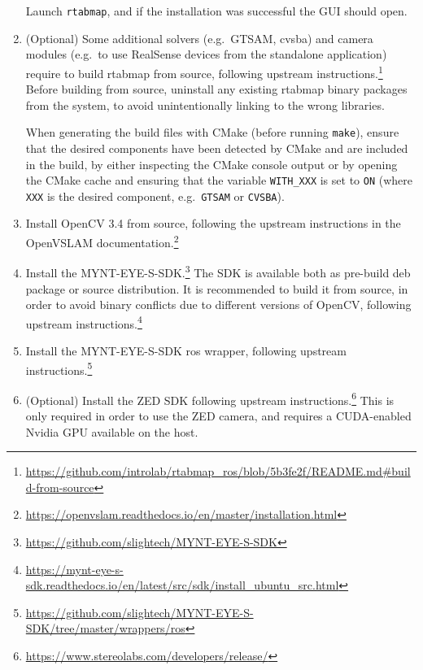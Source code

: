 \documentclass[11pt, letterpaper, twoside]{article}
\begin{document}
\begin{enumerate}
        Launch \texttt{rtabmap}, and if the installation was successful the GUI
        should open.

    \item (Optional) Some additional solvers (e.g.\ GTSAM, cvsba) and camera
        modules (e.g.\ to use RealSense devices from the standalone
        application) require to build \gls{rtabmap} from source, following
        upstream
        instructions.\footnote{\url{https://github.com/introlab/rtabmap_ros/blob/5b3fe2f/README.md\#build-from-source}}
        Before building from source, uninstall any existing \gls{rtabmap}
        binary packages from the system, to avoid unintentionally linking to
        the wrong libraries.

        When generating the build files with CMake (before
        running \texttt{make}), ensure that the desired components have been
        detected by CMake and are included in the build, by either inspecting
        the CMake console output or by opening the CMake cache and ensuring
        that the variable \texttt{WITH\_XXX} is set to \texttt{ON} (where
        \texttt{XXX} is the desired component, e.g.\ \texttt{GTSAM} or
        \texttt{CVSBA}).

    \item Install OpenCV 3.4 from source, following the upstream instructions
        in the OpenVSLAM
        documentation.\footnote{\url{https://openvslam.readthedocs.io/en/master/installation.html}}

    \item Install the
        MYNT-EYE-S-SDK.\footnote{\url{https://github.com/slightech/MYNT-EYE-S-SDK}}
        The SDK is available both as pre-build deb package or source
        distribution. It is recommended to build it from source, in order to
        avoid binary conflicts due to different versions of OpenCV, following
        upstream
        instructions.\footnote{\url{https://mynt-eye-s-sdk.readthedocs.io/en/latest/src/sdk/install_ubuntu_src.html}}

    \item Install the MYNT-EYE-S-SDK \gls{ros} wrapper, following upstream
        instructions.\footnote{\url{https://github.com/slightech/MYNT-EYE-S-SDK/tree/master/wrappers/ros}}

    \item (Optional) Install the ZED SDK following upstream
        instructions.\footnote{\url{https://www.stereolabs.com/developers/release/}}
        This is only required in order to use the ZED camera, and requires a
        CUDA-enabled Nvidia GPU available on the host.

\end{enumerate}
\end{document}
